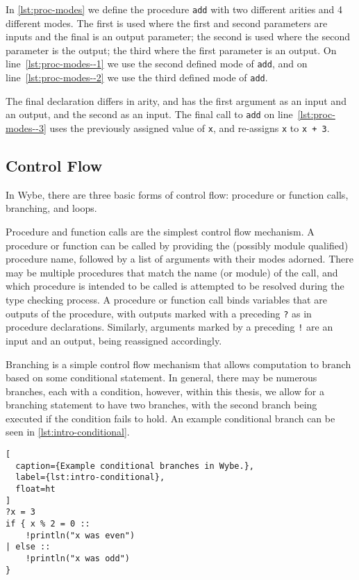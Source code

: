 In \cref{lst:proc-modes} we define the procedure \texttt{add} with two different arities and 4 different modes. The first is used where the first and second parameters are inputs and the final is an output parameter; the second is used where the second parameter is the output; the third where the first parameter is an output. On line~\ref{lst:proc-modes--1} we use the second defined mode of \texttt{add}, and on line~\ref{lst:proc-modes--2} we use the third defined mode of \texttt{add}. 

The final declaration differs in arity, and has the first argument as an input and an output, and the second as an input. The final call to \texttt{add} on line~\ref{lst:proc-modes--3} uses the previously assigned value of \texttt{x}, and re-assigns \texttt{x} to \texttt{x + 3}.

\subsection{Control Flow}

In Wybe, there are three basic forms of control flow: procedure or function calls, branching, and loops.

Procedure and function calls are the simplest control flow mechanism. A procedure or function can be called by providing the (possibly module qualified) procedure name, followed by a list of arguments with their modes adorned. There may be multiple procedures that match the name (or module) of the call, and which procedure is intended to be called is attempted to be resolved during the type checking process. A procedure or function call binds variables that are outputs of the procedure, with outputs marked with a preceding \texttt{?} as in procedure declarations. Similarly, arguments marked by a preceding \texttt{!} are an input and an output, being reassigned accordingly.

Branching is a simple control flow mechanism that allows computation to branch based on some conditional statement. In general, there may be numerous branches, each with a condition, however, within this thesis, we allow for a branching statement to have two branches, with the second branch being executed if the condition fails to hold. An example conditional branch can be seen in \cref{lst:intro-conditional}.

\begin{lstlisting}[
  caption={Example conditional branches in Wybe.},
  label={lst:intro-conditional},
  float=ht
]
?x = 3
if { x % 2 = 0 ::
    !println("x was even")
| else ::
    !println("x was odd")
}
\end{lstlisting}

